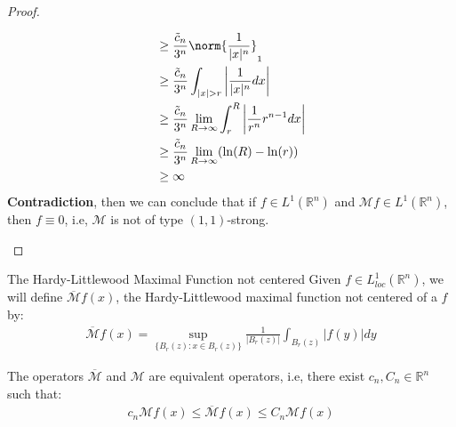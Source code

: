 \begin{proof}
\begin{enumerate}
\begin{align*}
        &\geq \frac{\tilde{c}_{n}}{3^n}\norm{\frac{1}{|x|^n}}_{1}\\
        &\geq \frac{\tilde{c}_{n}}{3^{n}}\int_{|x|>r}\left| \frac{1}{|x|^n}dx \right|\\
        &\geq \frac{\tilde{c}_{n}}{3^{n}}\lim_{R \to \infty}\int_{r}^{R}\left| \frac{1}{r^n}r^{n-1}dx \right|\\
        &\geq \frac{\tilde{c}_{n}}{3^{n}}\lim_{R \to \infty}(\ln(R)-\ln(r))\\
        &\geq \infty
      \end{align*}
      \textbf{Contradiction}, then we can conclude that if $f\in L^1(\mathbb{R}^{n})$ and $\mathcal{M}f\in L^1(\mathbb{R}^{n})$, then $f\equiv 0$, i.e, $\mathcal{M}$ is not of type $(1,1)$-strong. 
  \end{enumerate}
\end{proof}

\begin{definition}{The Hardy-Littlewood Maximal Function not centered}
  Given $f\in L^{1}_{loc}(\mathbb{R}^{n})$, we will define $\overline{\mathcal{M}}f(x)$, the Hardy-Littlewood maximal function not centered of a $f$ by:
  \begin{align*}
    \overline{\mathcal{M}}f(x)=\sup_{\{B_r(z): x\in B_{r}(z)\}}\frac{1}{|B_{r}(z)|}\int_{B_{r}(z)}|f(y)|dy
  \end{align*}
\end{definition}

\begin{proposition}{}
  The operators $\overline{\mathcal{M}}$ and $\mathcal{M}$ are equivalent operators, i.e, there exist $c_n, C_n\in \mathbb{R}^{n}$ such that:
  \begin{align*}
    c_n\mathcal{M}f(x)\leq \overline{\mathcal{M}}f(x)\leq C_n\mathcal{M}f(x)
  \end{align*}
\end{proposition}

